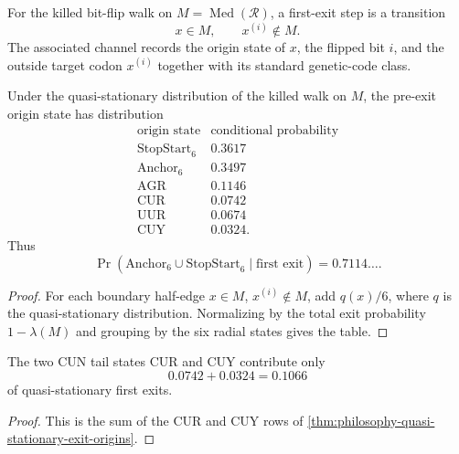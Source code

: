 \begin{definition}
\label{def:philosophy-first-exit-channel}
For the killed bit-flip walk on
$M=\operatorname{Med}(\mathcal R)$, a first-exit step is a transition
$$
  x\in M,\qquad x^{(i)}\notin M.
$$
The associated channel records the origin state of $x$, the flipped bit
$i$, and the outside target codon $x^{(i)}$ together with its standard
genetic-code class.
\end{definition}

\begin{theorem}
\label{thm:philosophy-quasi-stationary-exit-origins}
Under the quasi-stationary distribution of the killed walk on $M$, the
pre-exit origin state has distribution
$$
\begin{array}{c|r}
  \text{origin state} & \text{conditional probability}\\
  \hline
  \mathrm{StopStart}_{6} & 0.3617\\
  \mathrm{Anchor}_{6} & 0.3497\\
  \mathrm{AGR} & 0.1146\\
  \mathrm{CUR} & 0.0742\\
  \mathrm{UUR} & 0.0674\\
  \mathrm{CUY} & 0.0324.
\end{array}
$$
Thus
$$
  \Pr(\mathrm{Anchor}_{6}\cup\mathrm{StopStart}_{6}\mid
  \text{first exit})=0.7114\ldots.
$$
\end{theorem}
\begin{proof}
For each boundary half-edge $x\in M$, $x^{(i)}\notin M$, add
$q(x)/6$, where $q$ is the quasi-stationary distribution. Normalizing by
the total exit probability $1-\lambda(M)$ and grouping by the six radial
states gives the table.
\end{proof}

\begin{corollary}
\label{cor:philosophy-tail-not-dominant-exit-source}
The two CUN tail states $\mathrm{CUR}$ and $\mathrm{CUY}$ contribute
only
$$
  0.0742+0.0324=0.1066
$$
of quasi-stationary first exits.
\end{corollary}
\begin{proof}
This is the sum of the $\mathrm{CUR}$ and $\mathrm{CUY}$ rows of
\autoref{thm:philosophy-quasi-stationary-exit-origins}.
\end{proof}

